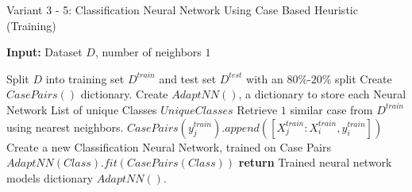 \documentclass[a4paper, 12pt]{report}
\begin{document}
\begin{algorithm}
    \caption{Variant 3 - 5: Classification Neural Network Using Case Based Heuristic (Training)}
    \label{alg:Classification_Varient3_5_using_CBH_train_alg19}

    \textbf{Input:} Dataset $D$, number of neighbors $1$
    \begin{algorithmic}
        \State Split $D$ into training set $D^{train}$ and test set $D^{test}$ with an $80\%$-$20\%$ split
        \State Create $CasePairs()$ dictionary.
        \State Create $AdaptNN()$, a dictionary to store each Neural Network
        \State List of unique Classes $UniqueClasses$
            \State Retrieve $1$ similar case from $D^{train}$ using nearest neighbors.
                \State $CasePairs(y^{train}_j).append([X^{train}_j:X^{train}_i, y^{train}_i])$
            \EndFor
        \EndFor
            \State Create a new Classification Neural Network, trained on Case Pairs
            \State $AdaptNN(Class).fit(CasePairs(Class))$
        \EndFor
        \State \textbf{return} Trained neural network models dictionary $AdaptNN()$.
    \end{algorithmic}
\end{algorithm}
\end{document}

